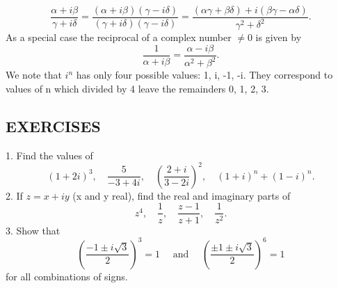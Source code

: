 \begin{equation*}
\frac {\alpha + i \beta}{\gamma + i \delta} = \frac {(\alpha + i \beta) (\gamma - i \delta)}{(\gamma + i \delta) (\gamma - i \delta)} = \frac {(\alpha \gamma + \beta \delta) + i (\beta \gamma - \alpha \delta)}{\gamma^ {2} + \delta^ {2}}.
\end{equation*}
As a special case the reciprocal of a complex number $\neq 0$ is given by
\begin{equation*}
\frac {1}{\alpha + i \beta} = \frac {\alpha - i \beta}{\alpha^ {2} + \beta^ {2}}.
\end{equation*}
We note that $i^{n}$ has only four possible values: 1, i, -1, -i. They correspond to values of n which divided by 4 leave the remainders 0, 1, 2, 3.

\subsection*{EXERCISES}
1. Find the values of
\begin{equation*}
(1 + 2 i) ^ {3}, \quad \frac {5}{- 3 + 4 i}, \quad \left(\frac {2 + i}{3 - 2 i}\right) ^ {2}, \quad (1 + i) ^ {n} + (1 - i) ^ {n}.
\end{equation*}
2. If $z = x + iy$ (x and y real), find the real and imaginary parts of
\begin{equation*}
z ^ {4}, \quad \frac {1}{z}, \quad \frac {z - 1}{z + 1}, \quad \frac {1}{z ^ {2}}.
\end{equation*}
3. Show that
\begin{equation*}
\left(\frac {- 1 \pm i \sqrt {3}}{2}\right) ^ {3} = 1 \quad \text { and } \quad \left(\frac {\pm 1 \pm i \sqrt {3}}{2}\right) ^ {6} = 1
\end{equation*}
for all combinations of signs.

